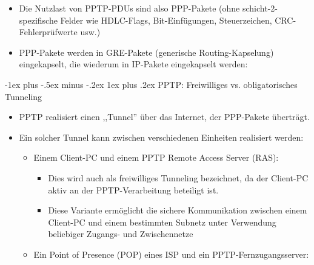 \documentclass[a4paper]{article}
\makeatletter
\renewcommand{\subsubsection}{\@startsection{subsubsection}{3}{0mm}%
 {-1ex plus -.5ex minus -.2ex}%
 {1ex plus .2ex}%
 {\normalfont\small\bfseries}}
\makeatother
\begin{document}
\begin{multicols}{3}
\begin{itemize}
              \begin{itemize}
                  \item
                        Die Nutzlast von PPTP-PDUs sind also PPP-Pakete (ohne
                        schicht-2-spezifische Felder wie HDLC-Flags, Bit-Einfügungen,
                        Steuerzeichen, CRC-Fehlerprüfwerte usw.)
                  \item
                        PPP-Pakete werden in GRE-Pakete (generische Routing-Kapselung)
                        eingekapselt, die wiederum in IP-Pakete eingekapselt werden:
              \end{itemize}
    \end{itemize}



    \subsubsection{PPTP: Freiwilliges vs. obligatorisches
        Tunneling}

    \begin{itemize}
        \item
              PPTP realisiert einen ,,Tunnel'' über das Internet, der PPP-Pakete
              überträgt.
        \item
              Ein solcher Tunnel kann zwischen verschiedenen Einheiten realisiert
              werden:

              \begin{itemize}
                  \item
                        Einem Client-PC und einem PPTP Remote Access Server (RAS):

                        \begin{itemize}
                            \item
                                  Dies wird auch als freiwilliges Tunneling bezeichnet, da der
                                  Client-PC aktiv an der PPTP-Verarbeitung beteiligt ist.
                            \item
                                  Diese Variante ermöglicht die sichere Kommunikation zwischen einem
                                  Client-PC und einem bestimmten Subnetz unter Verwendung beliebiger
                                  Zugangs- und Zwischennetze
                        \end{itemize}
                  \item
                        Ein Point of Presence (POP) eines ISP und ein
                        PPTP-Fernzugangsserver:


\end{itemize}
\end{itemize}
\end{multicols}
\end{document}

